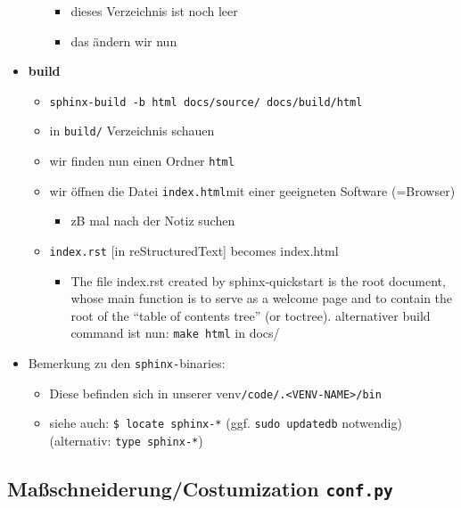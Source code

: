 \begin{itemize}
\begin{itemize}
    \begin{itemize}
    \tightlist
    \item
      dieses Verzeichnis ist noch leer
    \item
      das ändern wir nun
    \end{itemize}
  \end{itemize}
\item
  \textbf{build}

  \begin{itemize}
  \tightlist
  \item
    \texttt{sphinx-build\ -b\ html\ docs/source/\ docs/build/html}
  \item
    in \texttt{build/} Verzeichnis schauen
  \item
    wir finden nun einen Ordner \texttt{html}
  \item
    wir öffnen die Datei \texttt{index.html}mit einer geeigneten
    Software (=Browser)

    \begin{itemize}
    \tightlist
    \item
      zB mal nach der Notiz suchen
    \end{itemize}
  \item
    \texttt{index.rst} {[}in reStructuredText{]} becomes index.html

    \begin{itemize}
    \tightlist
    \item
      The file index.rst created by sphinx-quickstart is the root
      document, whose main function is to serve as a welcome page and to
      contain the root of the ``table of contents tree'' (or toctree).
      alternativer build command ist nun: \texttt{make\ html} in docs/
    \end{itemize}
  \end{itemize}
\item
  Bemerkung zu den \texttt{sphinx-}binaries:

  \begin{itemize}
  \tightlist
  \item
    Diese befinden sich in unserer
    venv\texttt{/code/.\textless{}VENV-NAME\textgreater{}/bin}
  \item
    siehe auch: \texttt{\$\ locate\ sphinx-*} (ggf.
    \texttt{sudo\ updatedb} notwendig) (alternativ:
    \texttt{type\ sphinx-*})
  \end{itemize}
\end{itemize}

\hypertarget{mauxdfschneiderungcostumization-conf.py}{%
\subsection{\texorpdfstring{Maßschneiderung/Costumization
\texttt{conf.py}}{Maßschneiderung/Costumization conf.py}}\label{mauxdfschneiderungcostumization-conf.py}}

